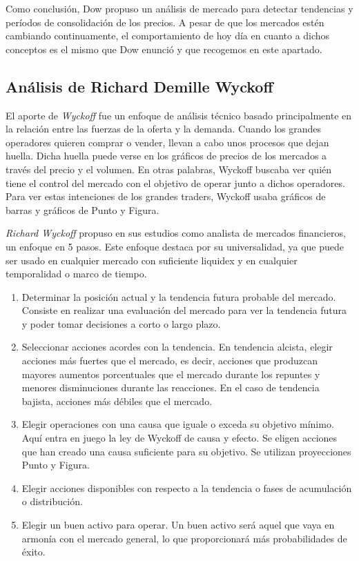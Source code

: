 Como conclusión, Dow propuso un análisis de mercado para detectar tendencias y períodos de consolidación de los precios. A pesar de que los mercados estén cambiando continuamente, el comportamiento de hoy día en cuanto a dichos conceptos es el mismo que Dow enunció y que recogemos en este apartado.


\subsection{Análisis de Richard Demille Wyckoff}

El aporte de \textit{Wyckoff} fue un enfoque de análisis técnico basado principalmente en la relación entre las fuerzas de la oferta y la demanda. Cuando los grandes operadores quieren comprar o vender, llevan a cabo unos procesos que dejan huella. Dicha huella puede verse en los gráficos de precios de los mercados a través del precio y el volumen. En otras palabras, Wyckoff buscaba ver quién tiene el control del mercado con el objetivo de operar junto a dichos operadores. Para ver estas intenciones de los grandes traders, Wyckoff usaba gráficos de barras y gráficos de Punto y Figura. \newline

\textit{Richard Wyckoff} propuso en sus estudios como analista de mercados financieros, un enfoque en 5 pasos. Este enfoque destaca por su universalidad, ya que puede ser usado en cualquier mercado con suficiente liquidex y en cualquier temporalidad o marco de tiempo. \newline

\begin{enumerate}
	\item Determinar la posición actual y la tendencia futura probable del mercado. Consiste en realizar una evaluación del mercado para ver la tendencia futura y poder tomar decisiones a corto o largo plazo.
	\item Seleccionar acciones acordes con la tendencia. En tendencia alcista, elegir acciones más fuertes que el mercado, es decir, acciones que produzcan mayores aumentos porcentuales que el mercado durante los repuntes y menores disminuciones durante las reacciones. En el caso de tendencia bajista, acciones más débiles que el mercado.
	\item Elegir operaciones con una causa que iguale o exceda su objetivo mínimo. Aquí entra en juego la ley de Wyckoff de causa y efecto. Se eligen acciones que han creado una causa suficiente para su objetivo. Se utilizan proyecciones Punto y Figura.
	\item Elegir acciones disponibles con respecto a la tendencia o fases de acumulación o distribución.
	\item Elegir un buen activo para operar. Un buen activo será aquel que vaya en armonía con el mercado general, lo que proporcionará más probabilidades de éxito.
\end{enumerate}

